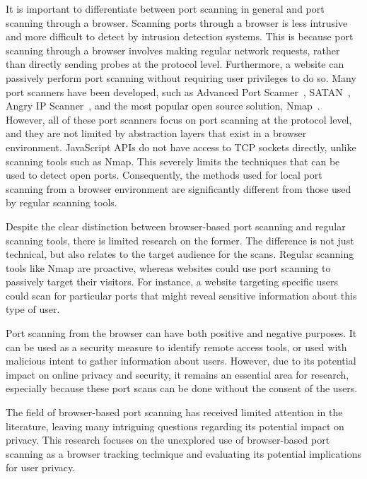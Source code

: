 It is important to differentiate between port scanning in general and port scanning through a browser. 
Scanning ports through a browser is less intrusive and more difficult to detect by intrusion detection systems. This is because port scanning through a browser involves making regular network requests, rather than directly sending probes at the protocol level. Furthermore, a website can passively perform port scanning without requiring user privileges to do so.
Many port scanners have been developed, such as Advanced Port Scanner~\cite{el2011}, SATAN~\cite{arce2008}, Angry IP Scanner~\cite{el2011}, and the most popular open source solution, Nmap~\cite{orebaugh201}. However, all of these port scanners focus on port scanning at the protocol level, and they are not limited by abstraction layers that exist in a browser environment. JavaScript APIs do not have access to TCP sockets directly, unlike scanning tools such as Nmap. This severely limits the techniques that can be used to detect open ports. Consequently, the methods used for local port scanning from a browser environment are significantly different from those used by regular scanning tools.

Despite the clear distinction between browser-based port scanning and regular scanning tools, there is limited research on the former. The difference is not just technical, but also relates to the target audience for the scans. Regular scanning tools like Nmap are proactive, whereas websites could use port scanning to passively target their visitors. For instance, a website targeting specific users could scan for particular ports that might reveal sensitive information about this type of user.

Port scanning from the browser can have both positive and negative purposes. It can be used as a security measure to identify remote access tools, or used with malicious intent to gather information about users. However, due to its potential impact on online privacy and security, it remains an essential area for research, especially because these port scans can be done without the consent of the users.

The field of browser-based port scanning has received limited attention in the literature, leaving many intriguing questions regarding its potential impact on privacy. This research focuses on the unexplored use of browser-based port scanning as a browser tracking technique and evaluating its potential implications for user privacy. 

